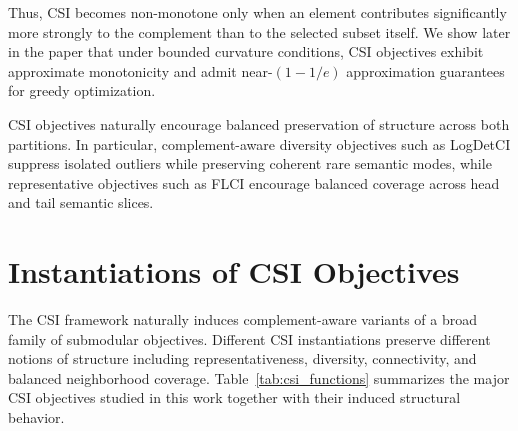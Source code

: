 \documentclass[11pt]{article}
\begin{document}
Thus, CSI becomes non-monotone only when an element contributes significantly more strongly to the complement than to the selected subset itself. We show later in the paper that under bounded curvature conditions, CSI objectives exhibit approximate monotonicity and admit near-$(1-1/e)$ approximation guarantees for greedy optimization.

CSI objectives naturally encourage balanced preservation of structure across both partitions. In particular, complement-aware diversity objectives such as LogDetCI suppress isolated outliers while preserving coherent rare semantic modes, while representative objectives such as FLCI encourage balanced coverage across head and tail semantic slices.


\section{Instantiations of CSI Objectives}

The CSI framework naturally induces complement-aware variants of a broad family of submodular objectives. Different CSI instantiations preserve different notions of structure including representativeness, diversity, connectivity, and balanced neighborhood coverage. Table~\ref{tab:csi_functions} summarizes the major CSI objectives studied in this work together with their induced structural behavior.
\end{document}
